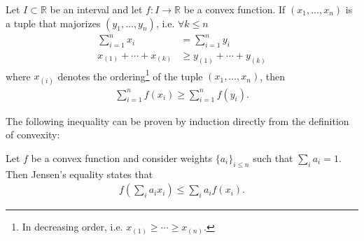     \begin{theorem}
        Let $I\subset\mathbb{R}$ be an interval and let $f:I\rightarrow\mathbb{R}$ be a convex function. If $(x_1, \ldots, x_n)$ is a tuple that majorizes $(y_1, \ldots, y_n)$, i.e. $\forall k\leq n$
        \begin{align}
            \sum_{i=1}^nx_i &= \sum_{i=1}^ny_i\\
            x_{(1)} + \cdots + x_{(k)}&\geq y_{(1)} + \cdots + y_{(k)}
        \end{align}
        where $x_{(i)}$ denotes the ordering\footnote{In decreasing order, i.e. $x_{(1)}\geq\cdots\geq x_{(n)}$.} of the tuple $(x_1, \ldots, x_n)$, then
        \begin{gather}
            \sum_{i=1}^nf(x_i)\geq \sum_{i=1}^nf(y_i).
        \end{gather}
    \end{theorem}
    The following inequality can be proven by induction directly from the definition of convexity:
    \begin{theorem}
        Let $f$ be a convex function and consider weights $\{a_i\}_{i\leq n}$ such that $\sum_ia_i=1$. Then Jensen's equality states that
        \begin{gather}
            \label{linalgebra:jensen_inequality}
            f\left(\sum_ia_ix_i\right) \leq \sum_ia_if(x_i).
        \end{gather}
    \end{theorem}